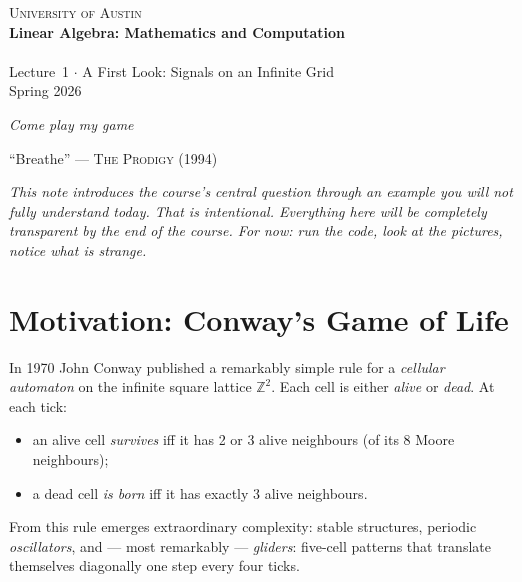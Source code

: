 \documentclass[11pt]{article}
\begin{document}

\begin{center}
  {\large\scshape University of Austin}\\[0.5cm]
  {\Large\bfseries Linear Algebra: Mathematics and Computation}\\[0.4cm]
  \hrulefill\hspace{0.25cm}{\large\leafleft\aldine\leafright}\hspace{0.25cm}\hrulefill\\[0.4cm]
  {\large Lecture~1 $\cdot$ A First Look: Signals on an Infinite Grid}\\[0.2cm]
  {\normalsize Spring 2026}
\end{center}

\epigraph{\itshape Come play my game}{``Breathe'' --- \textsc{The Prodigy} (1994)}

\bigskip\noindent
\textit{This note introduces the course's central question through an
example you will not fully understand today.  That is intentional.
Everything here will be completely transparent by the end of the course.
For now: run the code, look at the pictures, notice what is strange.}

\section*{Motivation: Conway's Game of Life}

In 1970 John Conway published a remarkably simple rule for a
\emph{cellular automaton} on the infinite square lattice
$\mathbb{Z}^2$.  Each cell is either \emph{alive} or \emph{dead}.
At each tick:
\begin{itemize}[nosep]
  \item an alive cell \emph{survives} iff it has 2 or 3 alive neighbours
        (of its 8 Moore neighbours);
  \item a dead cell \emph{is born} iff it has exactly 3 alive neighbours.
\end{itemize}
From this rule emerges extraordinary complexity: stable structures,
periodic \emph{oscillators}, and --- most remarkably --- \emph{gliders}:
five-cell patterns that translate themselves diagonally one step every
four ticks.
\end{document}

